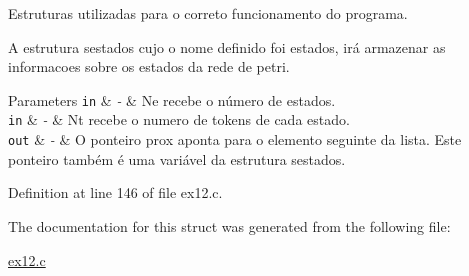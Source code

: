 \begin{DoxyItemize}
\item Estruturas utilizadas para o correto funcionamento do programa. 
\end{DoxyItemize}


\begin{DoxyItemize}
\item A estrutura sestados cujo o nome definido foi estados, irá armazenar as informacoes sobre os estados da rede de petri. 
\begin{DoxyParams}[1]{Parameters}
\mbox{\tt in}  & {\em -\/} & Ne recebe o número de estados. \\
\hline
\mbox{\tt in}  & {\em -\/} & Nt recebe o numero de tokens de cada estado. \\
\hline
\mbox{\tt out}  & {\em -\/} & O ponteiro prox aponta para o elemento seguinte da lista. Este ponteiro também é uma variável da estrutura sestados. \\
\hline
\end{DoxyParams}

\end{DoxyItemize}

Definition at line 146 of file ex12.\+c.



The documentation for this struct was generated from the following file\+:\begin{DoxyCompactItemize}
\item 
\hyperlink{ex12_8c}{ex12.\+c}\end{DoxyCompactItemize}
